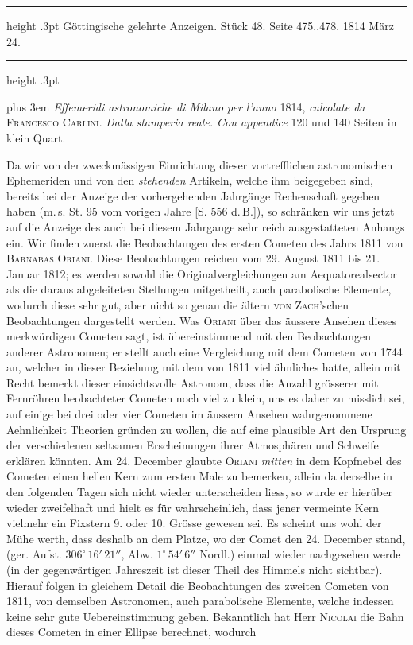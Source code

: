 \par\bigskip
\hypertarget{native-571-lower}{}
\begin{center}
\parbox{.79\linewidth}{%
\centering\small
\hrule height .3pt\relax\vspace{2.5pt}
Göttingische gelehrte Anzeigen. Stück 48. Seite 475..478. 1814 März 24.\par
\vspace{2.5pt}\hrule height .3pt\relax
}
\end{center}

{\rightskip=0pt plus 3em \emph{Effemeridi astronomiche di Milano per l'anno} 1814, \emph{calcolate da} \textsc{Francesco Carlini}. \emph{Dalla stamperia reale. Con appendice} 120 und 140 Seiten in klein Quart.\par}

Da wir von der zweckmässigen Einrichtung dieser vortrefflichen astronomischen Ephemeriden und von den \emph{stehenden} Artikeln, welche ihm beigegeben sind, bereits bei der Anzeige der vorhergehenden Jahrgänge Rechenschaft gegeben haben (m.\,s. St. 95 vom vorigen Jahre [S. 556 d.\,B.]), so schränken wir uns jetzt auf die Anzeige des auch bei diesem Jahrgange sehr reich ausgestatteten Anhangs ein. Wir finden zuerst die Beobachtungen des ersten Cometen des Jahrs 1811 von \textsc{Barnabas Oriani}. Diese Beobachtungen reichen vom 29. August 1811 bis 21. Januar 1812; es werden sowohl die Originalvergleichungen am Aequatorealsector als die daraus abgeleiteten Stellungen mitgetheilt, auch parabolische Elemente, wodurch diese sehr gut, aber nicht so genau die ältern \textsc{von Zach}'schen Beobachtungen dargestellt werden. Was \textsc{Oriani} über das äussere Ansehen dieses merkwürdigen Cometen sagt, ist übereinstimmend mit den Beobachtungen anderer Astronomen; er stellt auch eine Vergleichung mit dem Cometen von 1744 an, welcher in dieser Beziehung mit dem von 1811 viel ähnliches hatte, allein mit Recht bemerkt dieser einsichtsvolle Astronom, dass die Anzahl grösserer mit Fernröhren beobachteter Cometen noch viel zu klein, uns es daher zu misslich sei, auf einige bei drei oder vier Cometen im äussern Ansehen wahrgenommene Aehnlichkeit Theorien gründen zu wollen, die auf eine plausible Art den Ursprung der verschiedenen seltsamen Erscheinungen ihrer Atmosphären und Schweife erklären könnten. Am 24. December glaubte \textsc{Oriani} \emph{mitten} in dem Kopfnebel des Cometen einen hellen Kern zum ersten Male zu bemerken, allein da derselbe in den folgenden Tagen sich nicht wieder unterscheiden liess, so wurde er hierüber wieder zweifelhaft und hielt es für wahrscheinlich, dass jener vermeinte Kern vielmehr ein Fixstern 9. oder 10. Grösse gewesen sei. Es scheint uns wohl der Mühe werth, dass deshalb an dem Platze, wo der Comet den 24. December stand, (ger. Aufst. $306^\circ\,16'\,21''$, Abw. $1^\circ\,54'\,6''$ Nordl.) einmal wieder nachgesehen werde (in der gegenwärtigen Jahreszeit ist dieser Theil des Himmels nicht sichtbar). Hierauf folgen in gleichem Detail die Beobachtungen des zweiten Cometen von 1811, von demselben Astronomen, auch parabolische Elemente, welche indessen keine sehr gute Uebereinstimmung geben. Bekanntlich hat Herr \textsc{Nicolai} die Bahn dieses Cometen in einer Ellipse berechnet, wodurch 